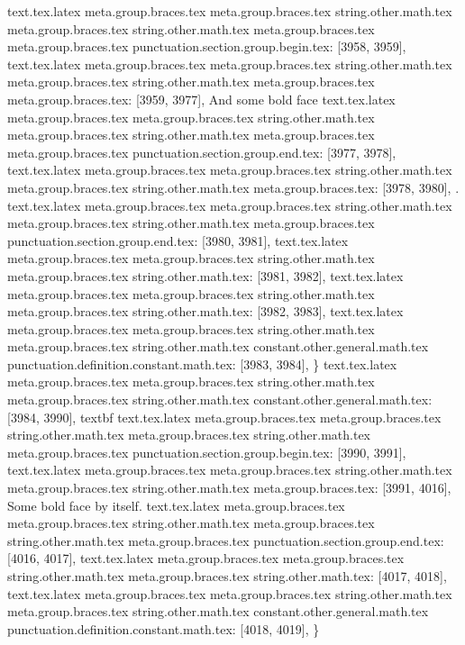 {{{{{{{{{{{{{{{{{{{{{{{{{{{{{{{{{{{{{{{{{{{{{{{{{{{{{{{{{{{{{{{{{{{{{{{{{{{{{{{{{{{{{{{{{{{{{{{{{{{{{{{{{{{{{{{{{{{{{{{{{{{{{{{text.tex.latex meta.group.braces.tex meta.group.braces.tex string.other.math.tex meta.group.braces.tex string.other.math.tex meta.group.braces.tex meta.group.braces.tex punctuation.section.group.begin.tex: [3958, 3959], {{}
text.tex.latex meta.group.braces.tex meta.group.braces.tex string.other.math.tex meta.group.braces.tex string.other.math.tex meta.group.braces.tex meta.group.braces.tex: [3959, 3977], {And some bold face}
text.tex.latex meta.group.braces.tex meta.group.braces.tex string.other.math.tex meta.group.braces.tex string.other.math.tex meta.group.braces.tex meta.group.braces.tex punctuation.section.group.end.tex: [3977, 3978], {}}
text.tex.latex meta.group.braces.tex meta.group.braces.tex string.other.math.tex meta.group.braces.tex string.other.math.tex meta.group.braces.tex: [3978, 3980], {.
}
text.tex.latex meta.group.braces.tex meta.group.braces.tex string.other.math.tex meta.group.braces.tex string.other.math.tex meta.group.braces.tex punctuation.section.group.end.tex: [3980, 3981], {}}
text.tex.latex meta.group.braces.tex meta.group.braces.tex string.other.math.tex meta.group.braces.tex string.other.math.tex: [3981, 3982], {
}
text.tex.latex meta.group.braces.tex meta.group.braces.tex string.other.math.tex meta.group.braces.tex string.other.math.tex: [3982, 3983], {
}
text.tex.latex meta.group.braces.tex meta.group.braces.tex string.other.math.tex meta.group.braces.tex string.other.math.tex constant.other.general.math.tex punctuation.definition.constant.math.tex: [3983, 3984], {\}
text.tex.latex meta.group.braces.tex meta.group.braces.tex string.other.math.tex meta.group.braces.tex string.other.math.tex constant.other.general.math.tex: [3984, 3990], {textbf}
text.tex.latex meta.group.braces.tex meta.group.braces.tex string.other.math.tex meta.group.braces.tex string.other.math.tex meta.group.braces.tex punctuation.section.group.begin.tex: [3990, 3991], {{}
text.tex.latex meta.group.braces.tex meta.group.braces.tex string.other.math.tex meta.group.braces.tex string.other.math.tex meta.group.braces.tex: [3991, 4016], {Some bold face by itself.}
text.tex.latex meta.group.braces.tex meta.group.braces.tex string.other.math.tex meta.group.braces.tex string.other.math.tex meta.group.braces.tex punctuation.section.group.end.tex: [4016, 4017], {}}
text.tex.latex meta.group.braces.tex meta.group.braces.tex string.other.math.tex meta.group.braces.tex string.other.math.tex: [4017, 4018], {
}
text.tex.latex meta.group.braces.tex meta.group.braces.tex string.other.math.tex meta.group.braces.tex string.other.math.tex constant.other.general.math.tex punctuation.definition.constant.math.tex: [4018, 4019], {\}
}}}}}}}}}}}}}}}}}}}}}}}}}}}}}}}}}}}}}}}}}}}}}}}}}}}}}}}}}}}}}}}}}}}}}}}}}}}}}}}}}}}}}}}}}}}}}}}}}}}}}}}}}}}}}}}}}}}}}}}}}}}}}}}}
